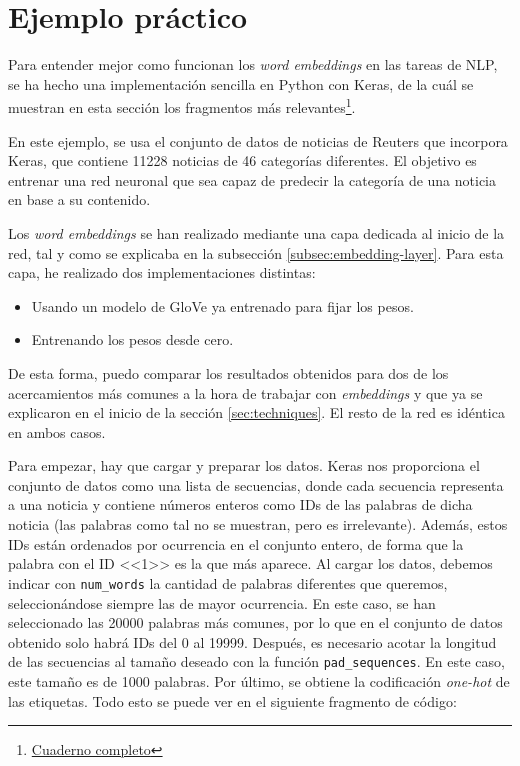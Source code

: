 \section{Ejemplo práctico}
\label{sec:example}

Para entender mejor como funcionan los \textit{word embeddings} en las tareas de
NLP, se ha hecho una implementación sencilla en Python con Keras, de la cuál se
muestran en esta sección los fragmentos más
relevantes\footnote{\href{https://colab.research.google.com/drive/18AUH4FhJLhtD1LyWpHcVVL2xvw_n5wN1?usp=sharing}{Cuaderno
        completo}}.

En este ejemplo, se usa el conjunto de datos de noticias de Reuters que
incorpora Keras, que contiene 11228 noticias de 46 categorías diferentes. El
objetivo es entrenar una red neuronal que sea capaz de predecir la categoría de
una noticia en base a su contenido.

Los \textit{word embeddings} se han realizado mediante una capa dedicada al
inicio de la red, tal y como se explicaba en la subsección
\ref{subsec:embedding-layer}. Para esta capa, he realizado dos implementaciones
distintas:

\begin{itemize}
    \item Usando un modelo de GloVe ya entrenado para fijar los pesos.
    \item Entrenando los pesos desde cero.
\end{itemize}

De esta forma, puedo comparar los resultados obtenidos para dos de los
acercamientos más comunes a la hora de trabajar con \textit{embeddings} y que ya
se explicaron en el inicio de la sección \ref{sec:techniques}. El resto de la
red es idéntica en ambos casos.

Para empezar, hay que cargar y preparar los datos. Keras nos proporciona el
conjunto de datos como una lista de secuencias, donde cada secuencia representa
a una noticia y contiene números enteros como IDs de las palabras de dicha
noticia (las palabras como tal no se muestran, pero es irrelevante). Además,
estos IDs están ordenados por ocurrencia en el conjunto entero, de forma que la
palabra con el ID <<1>> es la que más aparece. Al cargar los datos, debemos
indicar con \texttt{num\_words} la cantidad de palabras diferentes que queremos,
seleccionándose siempre las de mayor ocurrencia. En este caso, se han
seleccionado las 20000 palabras más comunes, por lo que en el conjunto de datos
obtenido solo habrá IDs del 0 al 19999. Después, es necesario acotar la longitud
de las secuencias al tamaño deseado con la función \texttt{pad\_sequences}. En
este caso, este tamaño es de 1000 palabras. Por último, se obtiene la
codificación \textit{one-hot} de las etiquetas. Todo esto se puede ver en el
siguiente fragmento de código:

